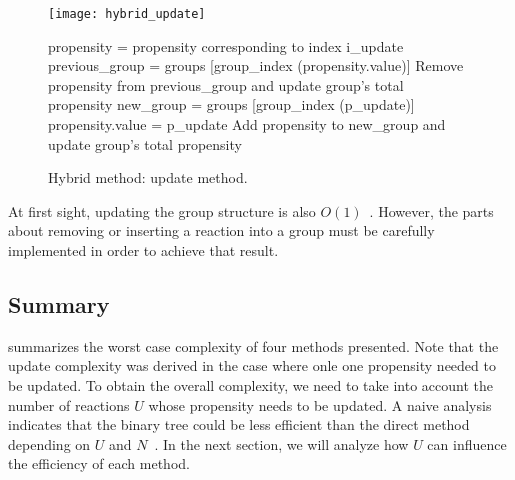 \begin{figure}[!h]
  \centering
  \begin{minipage}{\textwidth}
    \centering
    \texttt{[image: hybrid\_update]}
    \begin{algorithm}[H]
      \SetAlgoLined
      \KwData{$K+1$ groups, group k containing propensities whose value falls in the interval $(0,b]$ if k=0, $(2^{k-1}b, 2^kb]$ if k $>$ 0. Propensities are stored as a couple containing their value and original index. Index i\_update of propensity to update, new propensity value p\_update.}
  propensity = propensity corresponding to index i\_update\;
  previous\_group = groups [group\_index (propensity.value)]\;
  Remove propensity from previous\_group and update group's total propensity\;
  new\_group = groups [group\_index (p\_update)]\;
  propensity.value = p\_update\;
  Add propensity to new\_group and update group's total propensity\;
    \end{algorithm}
  \end{minipage}
  \caption{Hybrid method: update method.}
  \label{fig:hybrid_update}
\end{figure}

At first sight, updating the group structure is also $O(1)$~. However, the parts about removing or inserting a reaction into a group must be carefully implemented in order to achieve that result.

\subsection {Summary}

 summarizes the worst case complexity of four methods presented. Note that the update complexity was derived in the case where onle one propensity needed to be updated. To obtain the overall complexity, we need to take into account the number of reactions $U$ whose propensity needs to be updated. A naive analysis indicates that the binary tree could be less efficient than the direct method depending on $U$ and $N$~. In the next section, we will analyze how $U$ can influence the efficiency of each method.

